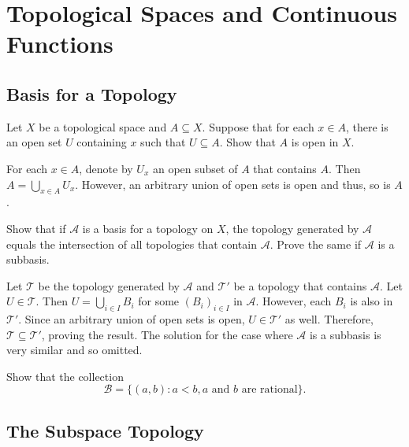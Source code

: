 \section{Topological Spaces and Continuous Functions}

\setcounter{subsection}{12}
\subsection{Basis for a Topology}

\begin{exercise}
	Let $X$ be a topological space and $A\subseteq X$. Suppose that for each $x\in A$, there is an open set $U$ containing $x$ such that $U\subseteq A$. Show that $A$ is open in $X$.
\end{exercise}
\begin{solution*}
	For each $x\in A$, denote by $U_x$ an open subset of $A$ that contains $A$. Then $A = \bigcup_{x\in A} U_x$. However, an arbitrary union of open sets is open and thus, so is $A$.
\end{solution*}

\setcounter{exercise}{4}
\begin{exercise}
	Show that if $\mathcal{A}$ is a basis for a topology on $X$, the topology generated by $\mathcal{A}$ equals the intersection of all topologies that contain $\mathcal{A}$. Prove the same if $\mathcal{A}$ is a subbasis.
\end{exercise}
\begin{solution*}
	Let $\mathcal{T}$ be the topology generated by $\mathcal{A}$ and $\mathcal{T}'$ be a topology that contains $\mathcal{A}$. Let $U\in\mathcal{T}$. Then $U=\bigcup_{i\in I} B_i$ for some $(B_i)_{i\in I}$ in $\mathcal{A}$. However, each $B_i$ is also in $\mathcal{T}'$. Since an arbitrary union of open sets is open, $U\in\mathcal{T'}$ as well. Therefore, $\mathcal{T}\subseteq\mathcal{T}'$, proving the result. The solution for the case where $\mathcal{A}$ is a subbasis is very similar and so omitted.
\end{solution*}

\begin{exercise}
	Show that the collection
	\[ \mathcal{B} = \{(a,b) : a<b, a\text{ and }b\text{ are rational}\}. \]
\end{exercise}

\setcounter{subsection}{15}
\subsection{The Subspace Topology}

